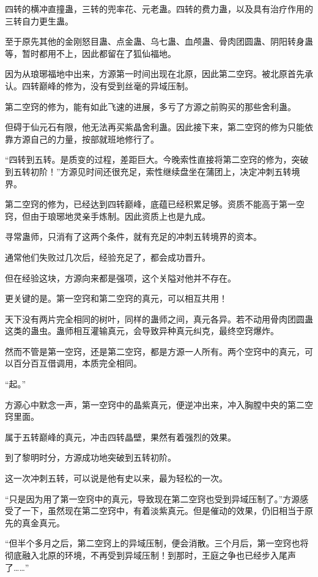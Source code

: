 \begin{this_body}
四转的横冲直撞蛊，三转的兜率花、元老蛊。四转的费力蛊，以及具有治疗作用的三转自力更生蛊。

至于原先其他的金刚怒目蛊、点金蛊、乌七蛊、血颅蛊、骨肉团圆蛊、阴阳转身蛊等，暂时都用不上，因此都留在了狐仙福地。

因为从琅琊福地中出来，方源第一时间出现在北原，因此第二空窍。被北原首先承认。四转巅峰的修为，没有受到丝毫的异域压制。

第二空窍的修为，能有如此飞速的进展，多亏了方源之前购买的那些舍利蛊。

但碍于仙元石有限，他无法再买紫晶舍利蛊。因此接下来，第二空窍的修为只能依靠方源自己的力量，按部就班地修行了。

“四转到五转。是质变的过程，差距巨大。今晚索性直接将第二空窍的修为，突破到五转初阶！”方源见时间还很充足，索性继续盘坐在蒲团上，决定冲刺五转境界。

第二空窍的修为，已经达到四转巅峰，底蕴已经积累足够。资质不能高于第一空窍，但由于琅琊地灵亲手炼制。因此资质上也是九成。

寻常蛊师，只消有了这两个条件，就有充足的冲刺五转境界的资本。

通常他们失败过几次后，经验充足了，都会成功晋升。

但在经验这块，方源向来都是强项，这个关隘对他并不存在。

更关键的是。第一空窍和第二空窍的真元，可以相互共用！

天下没有两片完全相同的树叶，同样的蛊师之间，真元各异。若不动用骨肉团圆蛊这类的蛊虫。蛊师相互灌输真元，会导致异种真元纠克，最终空窍爆炸。

然而不管是第一空窍，还是第二空窍，都是方源一人所有。两个空窍中的真元，可以百分百互借调用，本质完全相同。

“起。”

方源心中默念一声，第一空窍中的晶紫真元，便逆冲出来，冲入胸膛中央的第二空窍里面。

属于五转巅峰的真元，冲击四转晶壁，果然有着强烈的效果。

到了黎明时分，方源成功地突破到五转初阶。

这一次冲刺五转，可以说是他有史以来，最为轻松的一次。

“只是因为用了第一空窍中的真元，导致现在第二空窍也受到异域压制了。”方源感受了一下，虽然现在第二空窍中，有着淡紫真元。但是催动的效果，仍旧相当于原先的真金真元。

“但半个多月之后，第二空窍上的异域压制，便会消散。三个月后，第一空窍也将彻底融入北原的环境，不再受到异域压制！到那时，王庭之争也已经步入尾声了……”


\end{this_body}
